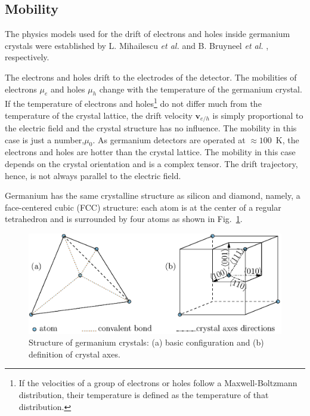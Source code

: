 \documentclass[epj]{svjour}
\begin{document}
\subsection{Mobility} 
\label{sec:pss:mobi} 

The physics models used for the drift of electrons and holes inside
germanium crystals were established by L. Mihailescu \textit{et
al.}\cite{miha} and B. Bruyneel \emph{et al.} \cite{bart},
respectively.

The electrons and holes drift to the electrodes of the detector. The
mobilities of electrons $\mu_{e}$ and holes $\mu_{h}$ change with the
temperature of the germanium crystal. If the temperature of electrons
and holes\footnote{If the velocities of a group of electrons or holes
follow a Maxwell-Boltzmann distribution, their temperature is defined
as the temperature of that distribution.} do not differ much from the
temperature of the crystal lattice, the drift velocity
$\mathbf{v}_{e/h}$ is simply proportional to the electric field and
the crystal structure has no influence. The mobility in this case is
just a number,$\mu_{0}$. As germanium detectors are operated at
$\approx 100$~K, the electrons and holes are hotter than the crystal
lattice. The mobility in this case depends on the crystal orientation
and is a complex tensor. The drift trajectory, hence, is not always
parallel to the electric field.
 
Germanium has the same crystalline structure as silicon and diamond,
namely, a face-centered cubic (FCC) structure: each atom is at the
center of a regular tetrahedron and is surrounded by four atoms as
shown in Fig.~\ref{f:xtal}.
 
\begin{figure}
\includegraphics[width=\linewidth]{xtalStruc}   
\caption{Structure of germanium crystals: (a) basic configuration and
(b) definition of crystal axes.}
\label{f:xtal} 
\end{figure} 
 
\end{document}
